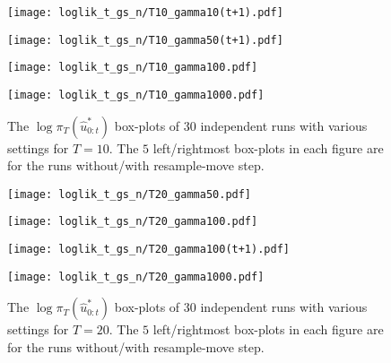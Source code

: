 \begin{figure}[!thbp]
    \centering
    \begin{minipage}{0.5\textwidth}
        \centering
        \texttt{[image: loglik\_t\_gs\_n/T10\_gamma10(t+1).pdf]}
    \end{minipage}%
    \begin{minipage}{0.5\textwidth}
        \centering
        \texttt{[image: loglik\_t\_gs\_n/T10\_gamma50(t+1).pdf]}
    \end{minipage}
    \begin{minipage}{0.5\textwidth}
        \centering
        \texttt{[image: loglik\_t\_gs\_n/T10\_gamma100.pdf]}
    \end{minipage}%
    \begin{minipage}{0.5\textwidth}
        \centering
        \texttt{[image: loglik\_t\_gs\_n/T10\_gamma1000.pdf]}
    \end{minipage}
    \caption{The $\log\pi_T(\hat{u}^*_{0:t})$ box-plots of 30 independent runs with various settings for $T=10$. The $5$ left/rightmost box-plots in each figure are for the runs without/with resample-move step.}
    \label{fig:rm2}
\end{figure}

\begin{figure}[!thbp]
    \centering
    \begin{minipage}{0.5\textwidth}
        \centering
        \texttt{[image: loglik\_t\_gs\_n/T20\_gamma50.pdf]}
    \end{minipage}%
    \begin{minipage}{0.5\textwidth}
        \centering
        \texttt{[image: loglik\_t\_gs\_n/T20\_gamma100.pdf]}
    \end{minipage}
    \begin{minipage}{0.5\textwidth}
        \centering
        \texttt{[image: loglik\_t\_gs\_n/T20\_gamma100(t+1).pdf]}
    \end{minipage}%
    \begin{minipage}{0.5\textwidth}
        \centering
        \texttt{[image: loglik\_t\_gs\_n/T20\_gamma1000.pdf]}
    \end{minipage}
    \caption{The $\log\pi_T(\hat{u}^*_{0:t})$ box-plots of 30 independent runs with various settings for $T=20$. The $5$ left/rightmost box-plots in each figure are for the runs without/with resample-move step.}
    \label{fig:rm3}
\end{figure}

